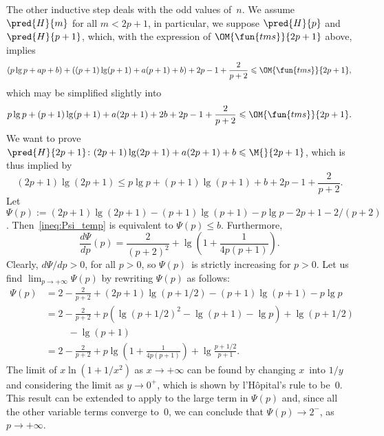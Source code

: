 The other inductive step deals with the odd values of~\(n\). We assume
\(\pred{H}{m}\) for all \(m < 2p+1\), in particular, we suppose
\(\pred{H}{p}\) and \(\pred{H}{p+1}\), which, with the expression of
\(\OM{\fun{tms}}{2p+1}\) above, implies
\begin{equation*}
(p\lg p + ap + b) + ((p+1)\lg(p+1) + a(p+1) + b) + 2p - 1 +
\frac{2}{p+2} \leqslant \OM{\fun{tms}}{2p+1},
\end{equation*}
which may be simplified slightly into
\begin{equation*}
p\lg p + (p+1)\lg(p+1) + a(2p+1) + 2b + 2p - 1 + \frac{2}{p+2}
\leqslant \OM{\fun{tms}}{2p+1}.
\end{equation*}
We want to prove \(\pred{H}{2p+1} \colon (2p+1)\lg(2p+1) +
a(2p+1) + b \leqslant \M{}{2p+1}\), which is thus implied by
\begin{equation}
  (2p+1)\lg(2p+1) \leqslant
  p\lg p + (p+1)\lg(p+1) + b + 2p - 1 + \frac{2}{p+2}.
\label{ineq:Psi_temp}
\end{equation}
Let \(\Psi(p) := (2p+1)\lg(2p+1) - (p+1)\lg(p+1) - p\lg p -
2p + 1 - 2/(p+2)\). Then~\eqref{ineq:Psi_temp} is equivalent to
\(\Psi(p) \leqslant b\). Furthermore,
\begin{equation*}
\frac{d\Psi}{dp}(p) = \frac{2}{(p+2)^2} + \lg\left(1+\frac{1}{4p(p+1)}\right).
\end{equation*}
Clearly, \(d\Psi/dp > 0\), for all \(p > 0\), so \(\Psi(p)\)~is
strictly increasing for \(p > 0\). Let us find \(\lim_{p \to
  +\infty}\Psi(p)\) by rewriting \(\Psi(p)\) as follows:
\begin{align*}
\Psi(p)
  &= 2 - \frac{2}{p+2} + (2p+1)\lg(p+1/2) - (p+1)\lg(p+1)
     - p\lg p\\
  &= 2 - \frac{2}{p+2} + p\left(\lg(p+1/2)^2 - \lg(p+1)
   - \lg p\right) + \lg(p+1/2)\\
  &\phantom{=} \quad - \lg(p+1)\\
  &= 2 - \frac{2}{p+2} + p\lg\left(1 + \frac{1}{4p(p+1)}\right) +
  \lg\frac{p + 1/2}{p+1}.
\end{align*}
The limit of \(x\ln(1+1/x^2)\) as \(x \to +\infty\) can be found by
changing \(x\)~into \(1/y\) and considering the limit as \(y \to
0^{+}\), which is shown by l'H\^{o}pital's rule to be~\(0\). This
result can be extended to apply to the large term in \(\Psi(p)\) and,
since all the other variable terms converge to~\(0\), we can conclude
that \(\Psi(p) \to 2^{-}\), as \(p \to +\infty\).

